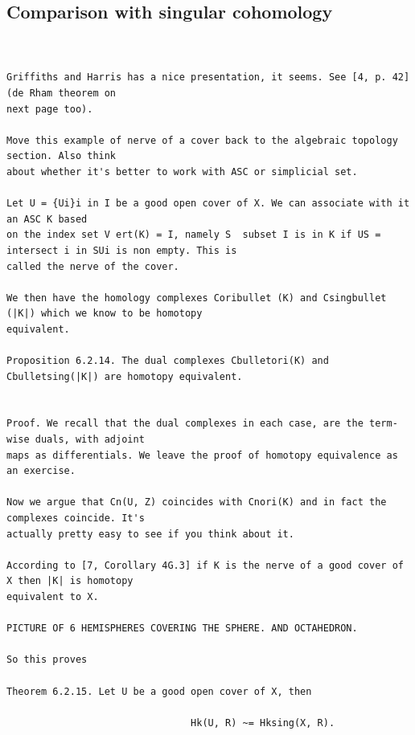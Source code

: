 \subsection{Comparison with singular cohomology}
\label{subsection-jethro-cech-6}
\begin{Verbatim}[fontsize=\footnotesize]


Griffiths and Harris has a nice presentation, it seems. See [4, p. 42] (de Rham theorem on
next page too).

Move this example of nerve of a cover back to the algebraic topology section. Also think
about whether it's better to work with ASC or simplicial set.

Let U = {Ui}i in I be a good open cover of X. We can associate with it an ASC K based
on the index set V ert(K) = I, namely S  subset I is in K if US =  intersect i in SUi is non empty. This is
called the nerve of the cover.

We then have the homology complexes Coribullet (K) and Csingbullet  (|K|) which we know to be homotopy
equivalent.

Proposition 6.2.14. The dual complexes Cbulletori(K) and Cbulletsing(|K|) are homotopy equivalent.


Proof. We recall that the dual complexes in each case, are the term-wise duals, with adjoint
maps as differentials. We leave the proof of homotopy equivalence as an exercise.

Now we argue that Cn(U, Z) coincides with Cnori(K) and in fact the complexes coincide. It's
actually pretty easy to see if you think about it.

According to [7, Corollary 4G.3] if K is the nerve of a good cover of X then |K| is homotopy
equivalent to X.

PICTURE OF 6 HEMISPHERES COVERING THE SPHERE. AND OCTAHEDRON.

So this proves

Theorem 6.2.15. Let U be a good open cover of X, then

                                Hk(U, R) ~= Hksing(X, R).




\end{Verbatim}

